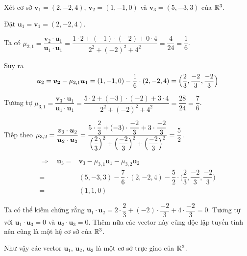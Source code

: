 \begin{example}
	Xét cơ sở $\bm{v}_1 = (2, -2, 4)$, $\bm{v}_2 = (1, -1, 0)$ và $\bm{v}_3 = (5, -3, 3)$ của $\mathbb{R}^3$.
	
	Đặt $\bm{u}_1 = \bm{v}_1 = (2, -2, 4)$.
	
	Ta có $\mu_{2,1} = \dfrac{\bm{v}_2 \cdot \bm{u}_1}{\bm{u}_1 \cdot \bm{u}_1} = \dfrac{1 \cdot 2 + (-1) \cdot (-2) + 0 \cdot 4}{2^2 + (-2)^2 + 4^2} = \dfrac{4}{24} = \dfrac{1}{6}$.
	
	Suy ra \[\bm{u}_2 = \bm{v_2} - \mu_{2, 1} \bm{u}_1 = (1, -1, 0) - \dfrac{1}{6} \cdot (2, -2, 4) = \Bigl(\dfrac{2}{3}, \dfrac{-2}{3}, \dfrac{-2}{3}\Bigr)\]
	
	Tương tự $\mu_{3, 1} = \dfrac{\bm{v}_3 \cdot \bm{u}_1}{\bm{u}_1 \cdot \bm{u}_1} = \dfrac{5 \cdot 2 + (-3) \cdot (-2) + 3 \cdot 4}{2^2 + (-2)^2 + 4^2} = \dfrac{28}{24} = \dfrac{7}{6}$.
	
	Tiếp theo $\mu_{3,2} = \dfrac{\bm{v}_3 \cdot \bm{u}_2}{\bm{u}_2 \cdot \bm{u}_2} = \dfrac{5 \cdot \dfrac{2}{3} + (-3) \cdot \dfrac{-2}{3} + 3 \cdot \dfrac{-2}{3}}{\Bigl(\dfrac{2}{3}\Bigr)^2 + \Bigl(\dfrac{-2}{3}\Bigr)^2 + \Bigl(\dfrac{-2}{3}\Bigr)^2 } = \dfrac{5}{2}$.
	
	\begin{align*}
		\Rightarrow \quad \bm{u}_3 = & \bm{v}_3 - \mu_{3,1} \bm{u}_1 - \mu_{3,2} \bm{u}_2 \\ = & (5, -3, 3) - \dfrac{7}{6} \cdot (2, -2, 4) - \dfrac{5}{2} \cdot \Big(\dfrac{2}{3}, \dfrac{-2}{3}, \dfrac{-2}{3}\Big) \\ = & (1, 1, 0)
	\end{align*}
	
	Ta có thể kiếm chứng rằng $\bm{u}_1 \cdot \bm{u}_2 = 2 \cdot \dfrac{2}{3} + (-2) \cdot \dfrac{-2}{3} + 4 \cdot \dfrac{-2}{3} = 0$. Tương tự với $\bm{u}_1 \cdot \bm{u}_3 = 0$ và $\bm{u}_2 \cdot \bm{u}_3 = 0$. Thêm nữa các vector này cũng độc lập tuyến tính nên cũng là một hệ cơ sở của $\mathbb{R}^3$.
	
	Như vậy các vector $\bm{u}_1$, $\bm{u}_2$, $\bm{u}_3$ là một cơ sở trực giao của $\mathbb{R}^3$.
\end{example}